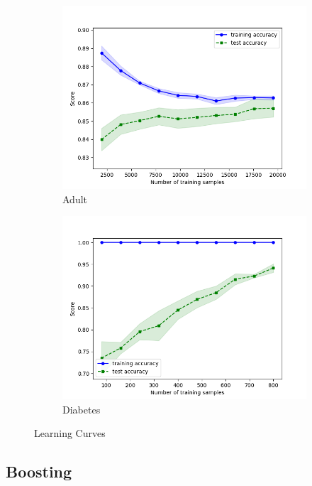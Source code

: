 \documentclass[11pt, twocolumn]{article}
\begin{document}
    \begin{figure}[!htbp]
        \begin{subfigure}{.24\textwidth}
            \centering
            \includegraphics[width=.9\textwidth]{learnings_Adult_DT_optimized}
            \caption{Adult}
            \label{fig:learnings_Adult_DT}
        \end{subfigure}
        \begin{subfigure}{.24\textwidth}
            \centering
            \includegraphics[width=.9\textwidth]{learnings_Diabetes_DT_optimized}
            \caption{Diabetes}
            \label{fig:learnings_Diabetes_DT}
        \end{subfigure}
        \caption{Learning Curves}
    \end{figure}
    \FloatBarrier

    \subsection{Boosting}
\end{document}
